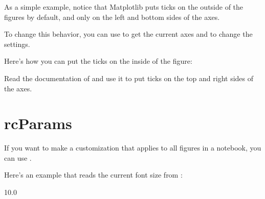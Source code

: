 \documentclass[letterpaper,10pt,english]{sphinxmanual}
\begin{document}
As a simple example, notice that Matplotlib puts ticks on the outside of the figures by default, and only on the left and bottom sides of the axes.

To change this behavior, you can use  to get the current axes and  to change the settings.

Here’s how you can put the ticks on the inside of the figure:

\begin{sphinxVerbatim}[commandchars=\\\{\}]
\end{sphinxVerbatim}

 Read the documentation of  and use it to put ticks on the top and right sides of the axes.

\begin{sphinxVerbatim}[commandchars=\\\{\}]

\end{sphinxVerbatim}


\section{rcParams}
\label{\detokenize{07_plot:rcparams}}
If you want to make a customization that applies to all figures in a notebook, you can use .

Here’s an example that reads the current font size from :

\begin{sphinxVerbatim}[commandchars=\\\{\}]
\PYG{p}{[}\PYG{p}{]}
\end{sphinxVerbatim}

\begin{sphinxVerbatim}[commandchars=\\\{\}]
10.0
\end{sphinxVerbatim}
\end{document}
